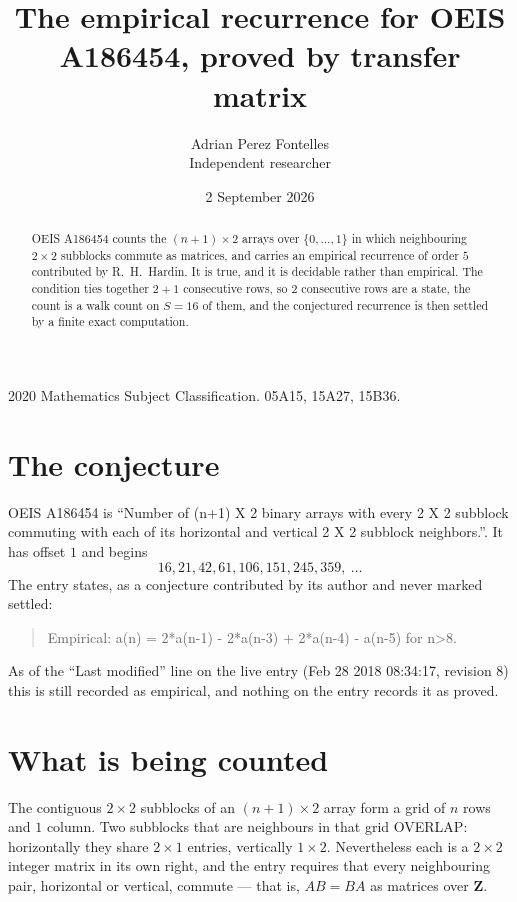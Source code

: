 \documentclass[11pt,a4paper]{article}
\title{The empirical recurrence for OEIS A186454, proved by transfer matrix}
\author{Adrian Perez Fontelles\\ \small Independent researcher}
\date{2 September 2026}
\theoremstyle{plain}
\theoremstyle{definition}
\begin{document}
\maketitle

\begin{abstract}
OEIS A186454 counts the $(n+1)\times2$ arrays over $\{0,\dots,1\}$ in which
neighbouring $2\times2$ subblocks commute as matrices, and carries an empirical recurrence
of order $5$ contributed by R.~H.~Hardin. It is true, and it is decidable rather than
empirical. The condition ties together $2+1$ consecutive rows, so $2$ consecutive rows are
a state, the count is a walk count on $S=16$ of them, and the conjectured recurrence is then
settled by a finite exact computation.
\end{abstract}

\noindent\small 2020 Mathematics Subject Classification. 05A15, 15A27, 15B36.\normalsize

\section{The conjecture}

OEIS A186454 is ``Number of (n+1) X 2 binary arrays with every 2 X 2 subblock commuting with each of its horizontal and vertical 2 X 2 subblock neighbors.''. It has offset $1$ and begins
\[
16, 21, 42, 61, 106, 151, 245, 359,\ \dots
\]
The entry states, as a conjecture contributed by its author and never marked settled:
\begin{quote}
Empirical: a(n) = 2*a(n-1) - 2*a(n-3) + 2*a(n-4) - a(n-5) for n>8.
\end{quote}
As of the ``Last modified'' line on the live entry (Feb 28 2018 08:34:17, revision 8) this is still
recorded as empirical, and nothing on the entry records it as proved.

\section{What is being counted}

The contiguous $2\times2$ subblocks of an $(n+1)\times2$ array form a grid of $n$
rows and $1$ column. Two subblocks that are neighbours in that
grid OVERLAP: horizontally they share $2\times1$ entries, vertically
$1\times2$. Nevertheless each is a $2\times2$ integer matrix in its own right, and
the entry requires that every neighbouring pair, horizontal or vertical, commute --- that is,
$AB=BA$ as matrices over $\mathbf{Z}$.
\end{document}
